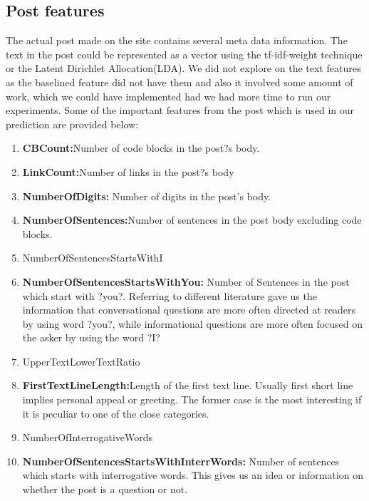 \documentclass[letterpaper,twocolumn,11pt]{article}
\begin{document}
\subsection{Post features}

The actual post made on the site contains several meta data information. The text in the post could be represented as a vector using the tf-idf-weight technique or the Latent  Dirichlet Allocation(LDA). We did not explore on the text features as the baselined feature did not have them and also it involved some amount of work, which we could have implemented had we had more time to run our experiments. Some of the important features from the post which is used in our prediction are provided below:

\begin{enumerate}
    \item \textbf{CBCount:}Number of code blocks in the post?s body.
    \item \textbf{LinkCount:}Number of links in the post?s body
    \item \textbf{NumberOfDigits:} Number of digits in the post's body.
    \item \textbf{NumberOfSentences:}Number of sentences in the post
body excluding code blocks.
    \item NumberOfSentencesStartsWithI
    \item \textbf{NumberOfSentencesStartsWithYou:} Number of Sentences in the post which start with ?you?.  Referring to different literature gave us the information that conversational questions are more often
directed at readers by using word ?you?, while informational questions are more often focused on the asker by using the word ?I?
    \item UpperTextLowerTextRatio
    \item \textbf{FirstTextLineLength:}Length  of  the  first  text  line. Usually first short line implies personal appeal or greeting. The former case is the most interesting if it is peculiar to one of the close categories.
    \item NumberOfInterrogativeWords
    \item \textbf{NumberOfSentencesStartsWithInterrWords:}  Number of  sentences  which  starts  with  interrogative  words. This gives us an idea or information on whether the post is a question or not.

\end{enumerate}

%
\end{document}

